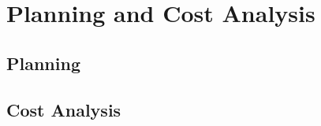 \chapter{Planning and Cost Analysis}\label{chap:planning}

\section{Planning}

\section{Cost Analysis}